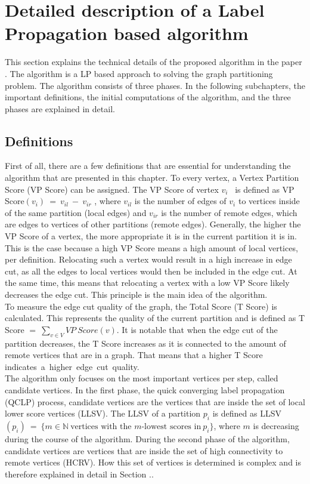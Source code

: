 \documentclass[acmsmall,nonacm,screen,review]{acmart}
\begin{document}
\section{Detailed description of a Label Propagation based algorithm}
This section explains the technical details of the proposed algorithm in the paper \cite{Main}. The algorithm is a LP based approach to solving the graph partitioning problem. The algorithm consists of three phases. In the following subchapters, the important definitions, the initial computations of the algorithm, and the three phases are explained in detail.
\subsection{Definitions}
First of all, there are a few definitions that are essential for understanding the algorithm that are presented in this chapter. To every vertex, a Vertex Partition Score (VP Score) can be assigned. The VP Score of vertex $v_{i}$ \ is defined as VP Score$(v_{i})\ =\ v_{il}\ -\ v_{ir}$ , where $v_{il}$ is the number of edges of $v_{i}$ to vertices inside of the same partition (local edges) and $v_{ir}$ is the number of remote edges, which are edges to vertices of other partitions (remote edges). Generally, the higher the VP Score of a vertex, the more appropriate it is in the current partition it is in. This is the case because a high VP Score means a high amount of local vertices, per definition. Relocating such a vertex would result in a high increase in edge cut, as all the edges to local vertices would then be included in the edge cut. At the same time, this means that relocating a vertex with a low VP Score likely decreases the edge cut. This principle is the main idea of the algorithm. \\
To measure the edge cut quality of the graph, the Total Score (T Score) is calculated. This represents the quality of the current partition and is defined as T Score $=\ \sum_{v\in V} VP\ Score(v)$. It is notable that when the edge cut of the partition decreases, the T Score increases as it is connected to the amount of remote vertices that are in a graph. That means that a higher T Score \hbox{indicates a higher edge cut quality.} \\
The algorithm only focuses on the most important vertices per step, called candidate vertices. In the first phase, the quick converging label propagation (QCLP) process, candidate vertices are the vertices that are inside the set of local lower score vertices (LLSV). The LLSV of a partition $p_{i}$ is defined as LLSV$(p_{i})\ =\ \{ m\in \mathbb{N}\ \text{vertices with the }m\text{-lowest scores in}\ p_{i}\}$, where $m$ is decreasing during the course of the algorithm. During the second phase of the algorithm, candidate vertices are vertices that are inside the set of high connectivity to remote vertices (HCRV). How this set of vertices is determined is complex and is therefore explained in detail in Section ..
\end{document}
